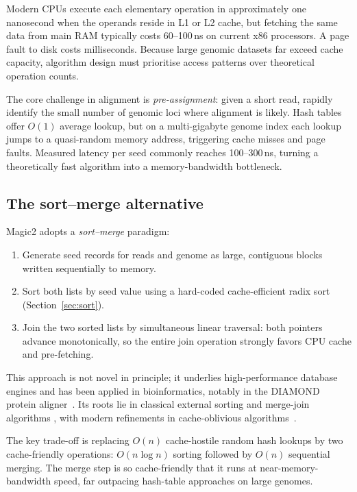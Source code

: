 \documentclass[11pt]{article}
\begin{document}
Modern CPUs execute each elementary operation in approximately one nanosecond when
the operands reside in L1 or L2 cache, but fetching the same data from
main RAM typically costs 60--100\,ns on current x86 processors.
A page fault to disk costs milliseconds.
Because large genomic datasets far exceed cache capacity, algorithm
design must prioritise access patterns over theoretical operation counts.

The core challenge in alignment is \emph{pre-assignment}: given a
short read, rapidly identify the small number of genomic loci where
alignment is likely.
Hash tables offer $O(1)$ average lookup, but on a multi-gigabyte
genome index each lookup jumps to a quasi-random memory address,
triggering cache misses and page faults.
Measured latency per seed commonly reaches 100--300\,ns, turning a
theoretically fast algorithm into a memory-bandwidth bottleneck.

\subsection{The sort--merge alternative}
\label{sec:sortmerge}

Magic2 adopts a \emph{sort--merge} paradigm:
\begin{enumerate}
\item Generate seed records for reads and genome as large, contiguous
      blocks written sequentially to memory.
\item Sort both lists by seed value using a hard-coded cache-efficient radix sort
      (Section~\ref{sec:sort}).
\item Join the two sorted lists by simultaneous linear traversal: both
  pointers advance monotonically, so the entire join operation strongly favors
  CPU cache and pre-fetching.
\end{enumerate}

This approach is not novel in principle; it underlies high-performance
database engines and has been applied in bioinformatics, notably in
the DIAMOND protein aligner~\citep{buchfink2021}.
Its roots lie in classical external sorting and merge-join algorithms
\citep{knuth1973}, with modern refinements in cache-oblivious
algorithms~\citep{frigo1999}.


The key trade-off is replacing $O(n)$ cache-hostile random hash lookups
by  two cache-friendly operations: $O(n \log n)$
sorting followed by $O(n)$ sequential merging.
The merge step is so cache-friendly that it runs at near-memory-bandwidth
speed, far outpacing hash-table approaches on large genomes.
\end{document}
